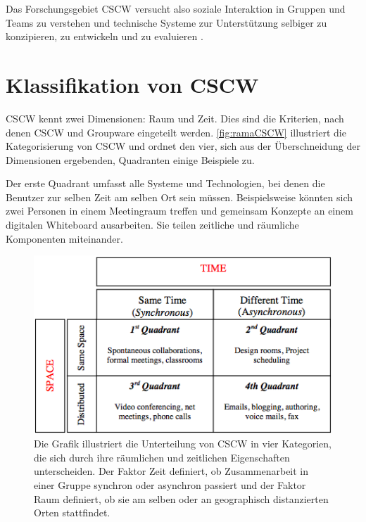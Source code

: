 	Das Forschungsgebiet \ac{CSCW} versucht also soziale Interaktion in Gruppen und Teams zu verstehen und technische Systeme zur Unterstützung selbiger zu konzipieren, zu entwickeln und zu evaluieren \citep{Koch2008}.

\section{Klassifikation von CSCW}

\ac{CSCW} kennt zwei Dimensionen: Raum und Zeit. Dies sind die Kriterien, nach denen \ac{CSCW} und Groupware eingeteilt werden. \autoref{fig:ramaCSCW} illustriert die Kategorisierung von \ac{CSCW} und ordnet den vier, sich aus der Überschneidung der Dimensionen ergebenden, Quadranten einige Beispiele zu. 

Der erste Quadrant umfasst alle Systeme und Technologien, bei denen die Benutzer zur selben Zeit am selben Ort sein müssen. Beispielsweise könnten sich zwei Personen in einem Meetingraum treffen und gemeinsam Konzepte an einem digitalen Whiteboard ausarbeiten. Sie teilen zeitliche und räumliche Komponenten miteinander. 

\begin{figure}
	\includegraphics[width=\textwidth]{gfx/ramaCSCWQuadranten.png}
	\caption[CSCW-Kategorien \newline \citep{Rama:2006p245}]{Die Grafik illustriert die Unterteilung von CSCW in vier Kategorien, die sich durch ihre räumlichen und zeitlichen Eigenschaften unterscheiden. Der Faktor Zeit definiert, ob Zusammenarbeit in einer Gruppe synchron oder asynchron passiert und der Faktor Raum definiert, ob sie am selben oder an geographisch distanzierten Orten stattfindet.}
	\label{fig:ramaCSCW}
\end{figure}

